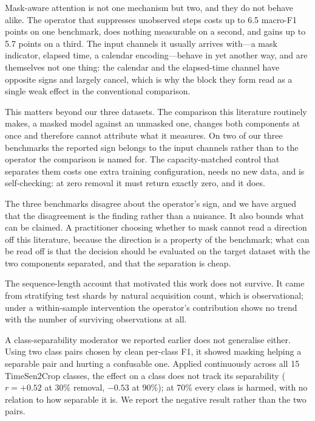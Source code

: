 \documentclass[journal]{IEEEtran}
\begin{document}
Mask-aware attention is not one mechanism but two, and they do not behave alike.
The operator that suppresses unobserved steps costs up to 6.5 macro-F1 points on
one benchmark, does nothing measurable on a second, and gains up to 5.7 points
on a third. The input channels it usually arrives with---a mask indicator,
elapsed time, a calendar encoding---behave in yet another way, and are
themselves not one thing: the calendar and the elapsed-time channel have
opposite signs and largely cancel, which is why the block they form read as a
single weak effect in the conventional comparison.

This matters beyond our three datasets. The comparison this literature
routinely makes, a masked model against an unmasked one, changes both components
at once and therefore cannot attribute what it measures. On two of our three
benchmarks the reported sign belongs to the input channels rather than to the
operator the comparison is named for. The capacity-matched control that
separates them costs one extra training configuration, needs no new data, and is
self-checking: at zero removal it must return exactly zero, and it does.

The three benchmarks disagree about the operator's sign, and we have argued that
the disagreement is the finding rather than a nuisance. It also bounds what can
be claimed. A practitioner choosing whether to mask cannot read a direction off
this literature, because the direction is a property of the benchmark; what can
be read off is that the decision should be evaluated on the target dataset with
the two components separated, and that the separation is cheap.

The sequence-length account that motivated this work does not survive. It came
from stratifying test shards by natural acquisition count, which is
observational; under a within-sample intervention the operator's contribution
shows no trend with the number of surviving observations at all.

A class-separability moderator we reported earlier does not generalise either.
Using two class pairs chosen by clean per-class F1, it showed masking helping a
separable pair and hurting a confusable one. Applied continuously across all 15
TimeSen2Crop classes, the effect on a class does not track its separability
($r = +0.52$ at 30\% removal, $-0.53$ at 90\%); at 70\% every class is harmed,
with no relation to how separable it is. We report the negative result rather
than the two pairs.
\end{document}
